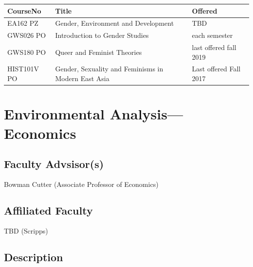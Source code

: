 \documentclass{article}\usepackage[]{graphicx}\usepackage[]{xcolor}
\newenvironment{itemize*}%
  {\begin{itemize}%
    \setlength{\itemsep}{0pt}%
    \setlength{\parskip}{0pt}}%
  {\end{itemize}}
\begin{document}
\begin{description}
\begin{table}[ht]
\centering
\begin{tabular}{lll}
  \hline
CourseNo & Title & Offered \\ 
  \hline
EA162 PZ & Gender, Environment and Development & TBD \\ 
  GWS026 PO & Introduction to Gender Studies & each semester \\ 
  GWS180 PO & Queer and Feminist Theories & last offered fall 2019 \\ 
  HIST101V PO & Gender, Sexuality and Feminisms in Modern East Asia & Last offered Fall 2017 \\ 
   \hline
\end{tabular}
\end{table}


\end{description}


\newpage
\section{Environmental Analysis---Economics}



\subsection{Faculty Advsisor(s)}

\begin{itemize*}
  \item Bowman Cutter (Associate Professor of Economics)
\end{itemize*}

\subsection{Affiliated Faculty}

\begin{itemize*}
  \item TBD (Scripps)
\end{itemize*}

\subsection{Description}
\end{document}
